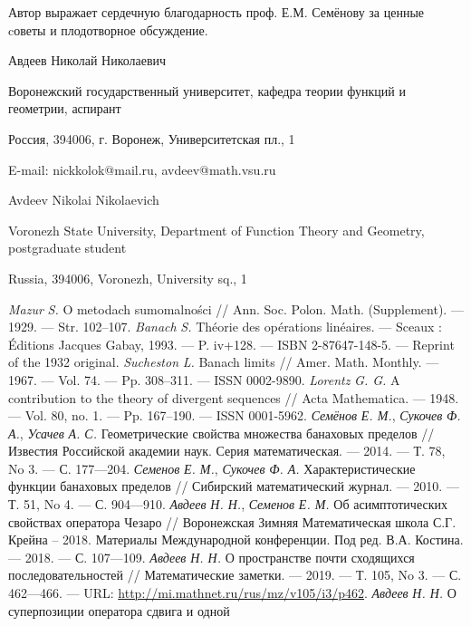 \documentclass[a4paper,14pt]{article} %
\theoremstyle{plain}
\begin{document}
Автор выражает сердечную благодарность проф. Е.М. Семёнову за ценные cоветы и плодотворное обсуждение.


Авдеев Николай Николаевич

Воронежский государственный университет, кафедра теории функций и геометрии, аспирант

Россия, 394006, г. Воронеж, Университетская пл., 1

E-mail: nickkolok@mail.ru, avdeev@math.vsu.ru


Avdeev Nikolai Nikolaevich

Voronezh State University, Department of Function Theory and Geometry, postgraduate student

Russia, 394006, Voronezh, University sq., 1


\begin{thebibliography}{99}
%
\emph{Mazur} \emph{S.} O metodach sumomalności // Ann. Soc. Polon.
Math. (Supplement). — 1929. — Str. 102–107.
%
\emph{Banach} \emph{S.} Théorie des opérations linéaires. — Sceaux :
Éditions Jacques Gabay, 1993. — P. iv+128. — ISBN 2-87647-148-5. —
Reprint of the 1932 original.
%
\emph{Sucheston} \emph{L.} Banach limits // Amer. Math. Monthly. —
1967. — Vol. 74. — Pp. 308–311. — ISSN 0002-9890.
%
\emph{Lorentz} \emph{G. G.} A contribution to the theory of divergent
sequences // Acta Mathematica. — 1948. — Vol. 80, no. 1. —
Pp. 167–190. — ISSN 0001-5962.
%
\emph{Семёнов} \emph{Е. М.}, \emph{Сукочев} \emph{Ф. А.},
\emph{Усачев} \emph{А. С.} Геометрические свойства множества
банаховых пределов // Известия Российской академии наук. Серия
математическая. — 2014. — Т. 78, No 3. — С. 177—204.
%
\emph{Семенов} \emph{Е. М.}, \emph{Сукочев} \emph{Ф. А.}
Характеристические функции банаховых пределов // Сибирский
математический журнал. — 2010. — Т. 51, No 4. — С. 904—910.
%
\emph{Авдеев} \emph{Н. Н.}, \emph{Семенов} \emph{Е. М.} Об
асимптотических свойствах оператора Чезаро // Воронежская Зимняя
Математическая школа С.Г. Крейна – 2018. Материалы Международной
конференции. Под ред. В.А. Костина. — 2018. — С. 107—109.
%
\emph{Авдеев} \emph{Н. Н.} О пространстве почти сходящихся
последовательностей // Математические заметки. — 2019. — Т. 105, No 3. —
С. 462—466. — URL: \url {http://mi.mathnet.ru/rus/mz/v105/i3/p462}.
%
\emph{Авдеев} \emph{Н. Н.} О суперпозиции оператора сдвига и одной

\end{thebibliography}
\end{document}
